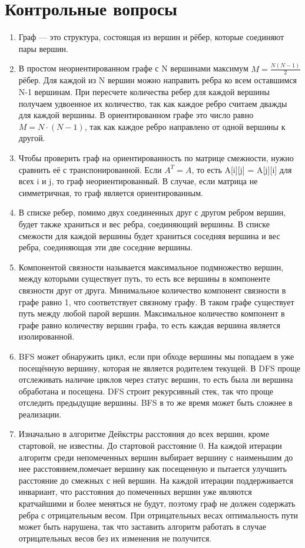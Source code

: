 \documentclass[12pt]{article}
\begin{document}
\section*{Контрольные вопросы}
\begin{enumerate}
    \item Граф — это структура, состоящая из вершин и рёбер, которые соединяют пары вершин. 
    \item В простом неориентированном графе с N вершинами максимум $M = \frac{N(N-1)}{2}$ рёбер. Для каждой из N вершин можно направить ребра ко всем оставшимся N-1 вершинам. При пересчете количества ребер для каждой вершины получаем удвоенное их количество, так как каждое ребро считаем дважды для каждой вершины. В ориентированном графе это число равно $ M = N \cdot(N-1) $, так как каждое ребро направлено от одной вершины к другой.
    \item  Чтобы проверить граф на ориентированность по матрице смежности, нужно сравнить её с транспонированной. Если $A^T = A$, то есть A[i][j] = A[j][i] для всех i и j, то граф неориентированный. В случае, если матрица не симметричная, то граф является ориентированным. 
    \item   
    В списке ребер, помимо двух соединенных друг с другом ребром вершин, будет  также храниться и вес ребра, соединяющий вершины. В списке смежости для каждой вершины будет храниться соседняя вершина и вес ребра, соединяющая эти две соседние вершины.
    \item Компонентой связности называется максимальное подмножество вершин, между которыми существует путь, то есть все вершины в компоненте связности друг от друга. Минимальное количество компонент связности в графе равно 1, что соответствует связному графу. В таком графе существует путь между любой парой вершин.  Максимальное количество компонент в графе равно количеству вершин графа, то есть каждая вершина является изолированной.
    \item BFS может обнаружить цикл, если при обходе вершины мы попадаем в уже посещённую вершину, которая не является родителем текущей. В DFS проще отслеживать наличие циклов через статус вершин, то есть была ли вершина обработана и посещена. DFS строит рекурсивный стек, так что проще отследить предыдущие вершины. BFS в то же время может быть сложнее в реализации.
    \item Изначально в алгоритме Дейкстры расстояния до
    всех вершин, кроме стартовой, не известны. До стартовой расстояние 0.
    На каждой итерации алгоритм среди непомеченных вершин выбирает вершину с наименьшим до нее расстоянием,помечает вершину как посещенную и пытается улучшить расстояние до смежных с ней вершин. На каждой итерации поддерживается инвариант, что расстояния до помеченных вершин уже являются кратчайшими и более меняться не будут, поэтому граф не должен содержать ребра с отрицательным весом. При отрицательных весах оптимальность пути может быть нарушена, так что заставить алгоритм работать в случае отрицательных весов без их изменения не получится.

\end{enumerate}
\end{document}
